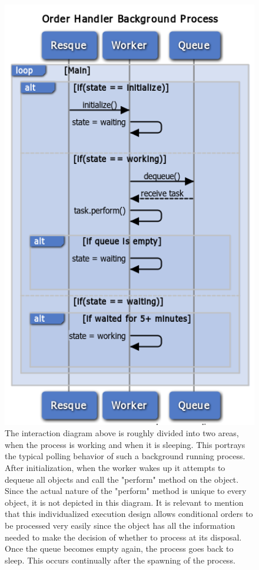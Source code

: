\begin{figure}[H]
\centering
\includegraphics[width=4.5in]{./Diagrams/ComponentModels/stateMachineDiagrams/Worker1/worker1.png}
\caption{The interaction diagram above is roughly divided into two areas, when the process is working and when it is sleeping. This portrays the typical polling behavior of such a background running process. After initialization, when the worker wakes up it attempts to dequeue all objects and call the "perform" method on the object. Since the actual nature of the "perform" method is unique to every object, it is not depicted in this diagram. It is relevant to mention that this individualized execution design allows conditional orders to be processed very easily since the object has all the information needed to make the decision of whether to process at its disposal. Once the queue becomes empty again, the process goes back to sleep. This occurs continually after the spawning of the process.}
\end{figure}

